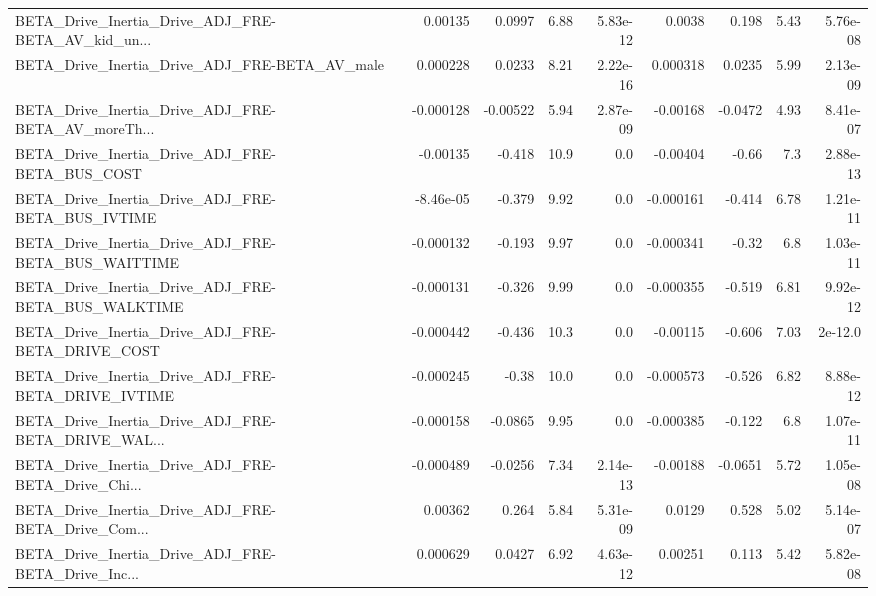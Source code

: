 \begin{tabular}{lrrrrrrrr}
BETA\_Drive\_Inertia\_Drive\_ADJ\_FRE-BETA\_AV\_kid\_un... &     0.00135 &       0.0997 &     6.88 & 5.83e-12 &     0.0038 &       0.198 &         5.43 &      5.76e-08 \\
BETA\_Drive\_Inertia\_Drive\_ADJ\_FRE-BETA\_AV\_male      &    0.000228 &       0.0233 &     8.21 & 2.22e-16 &   0.000318 &      0.0235 &         5.99 &      2.13e-09 \\
BETA\_Drive\_Inertia\_Drive\_ADJ\_FRE-BETA\_AV\_moreTh... &   -0.000128 &     -0.00522 &     5.94 & 2.87e-09 &   -0.00168 &     -0.0472 &         4.93 &      8.41e-07 \\
BETA\_Drive\_Inertia\_Drive\_ADJ\_FRE-BETA\_BUS\_COST     &    -0.00135 &       -0.418 &     10.9 &      0.0 &   -0.00404 &       -0.66 &          7.3 &      2.88e-13 \\
BETA\_Drive\_Inertia\_Drive\_ADJ\_FRE-BETA\_BUS\_IVTIME   &   -8.46e-05 &       -0.379 &     9.92 &      0.0 &  -0.000161 &      -0.414 &         6.78 &      1.21e-11 \\
BETA\_Drive\_Inertia\_Drive\_ADJ\_FRE-BETA\_BUS\_WAITTIME &   -0.000132 &       -0.193 &     9.97 &      0.0 &  -0.000341 &       -0.32 &          6.8 &      1.03e-11 \\
BETA\_Drive\_Inertia\_Drive\_ADJ\_FRE-BETA\_BUS\_WALKTIME &   -0.000131 &       -0.326 &     9.99 &      0.0 &  -0.000355 &      -0.519 &         6.81 &      9.92e-12 \\
BETA\_Drive\_Inertia\_Drive\_ADJ\_FRE-BETA\_DRIVE\_COST   &   -0.000442 &       -0.436 &     10.3 &      0.0 &   -0.00115 &      -0.606 &         7.03 &       2e-12.0 \\
BETA\_Drive\_Inertia\_Drive\_ADJ\_FRE-BETA\_DRIVE\_IVTIME &   -0.000245 &        -0.38 &     10.0 &      0.0 &  -0.000573 &      -0.526 &         6.82 &      8.88e-12 \\
BETA\_Drive\_Inertia\_Drive\_ADJ\_FRE-BETA\_DRIVE\_WAL... &   -0.000158 &      -0.0865 &     9.95 &      0.0 &  -0.000385 &      -0.122 &          6.8 &      1.07e-11 \\
BETA\_Drive\_Inertia\_Drive\_ADJ\_FRE-BETA\_Drive\_Chi... &   -0.000489 &      -0.0256 &     7.34 & 2.14e-13 &   -0.00188 &     -0.0651 &         5.72 &      1.05e-08 \\
BETA\_Drive\_Inertia\_Drive\_ADJ\_FRE-BETA\_Drive\_Com... &     0.00362 &        0.264 &     5.84 & 5.31e-09 &     0.0129 &       0.528 &         5.02 &      5.14e-07 \\
BETA\_Drive\_Inertia\_Drive\_ADJ\_FRE-BETA\_Drive\_Inc... &    0.000629 &       0.0427 &     6.92 & 4.63e-12 &    0.00251 &       0.113 &         5.42 &      5.82e-08 \\

\end{tabular}
